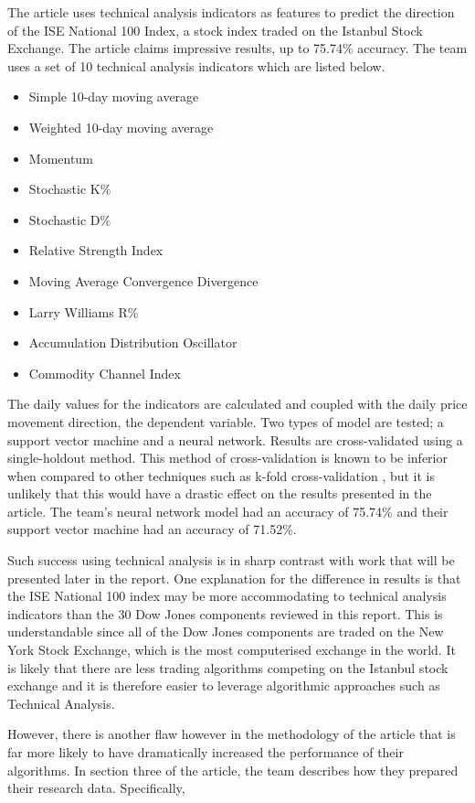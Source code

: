\documentclass{report}
\begin{document}
The article uses technical analysis indicators as features to predict the direction of the ISE National 100 Index, a stock index traded on the Istanbul Stock Exchange. The article claims impressive results, up to 75.74\% accuracy. The team uses a set of 10 technical analysis indicators which are listed below.

\begin{itemize}[noitemsep]
  \item Simple 10-day moving average
  \item Weighted 10-day moving average
  \item Momentum
  \item Stochastic K\%
  \item Stochastic D\%
  \item Relative Strength Index
  \item Moving Average Convergence Divergence
  \item Larry Williams R\%
  \item Accumulation Distribution Oscillator
  \item Commodity Channel Index
\end{itemize}

The daily values for the indicators are calculated and coupled with the daily price movement direction, the dependent variable. Two types of model are tested; a support vector machine and a neural network. Results are cross-validated using a single-holdout method. This method of cross-validation is known to be inferior when compared to other techniques such as k-fold cross-validation \cite{kohavi1995study}, but it is unlikely that this would have a drastic effect on the results presented in the article. The team's neural network model had an accuracy of 75.74\% and their support vector machine had an accuracy of 71.52\%.

Such success using technical analysis is in sharp contrast with work that will be presented later in the report. One explanation for the difference in results is that the ISE National 100 index may be more accommodating to technical analysis indicators than the 30 Dow Jones components reviewed in this report. This is understandable since all of the Dow Jones components are traded on the New York Stock Exchange, which is the most computerised exchange in the world. It is likely that there are less trading algorithms competing on the Istanbul stock exchange and it is therefore easier to leverage algorithmic approaches such as Technical Analysis.

However, there is another flaw however in the methodology of the article that is far more likely to have dramatically increased the performance of their algorithms. In section three of the article, the team describes how they prepared their research data. Specifically, 
\end{document}
